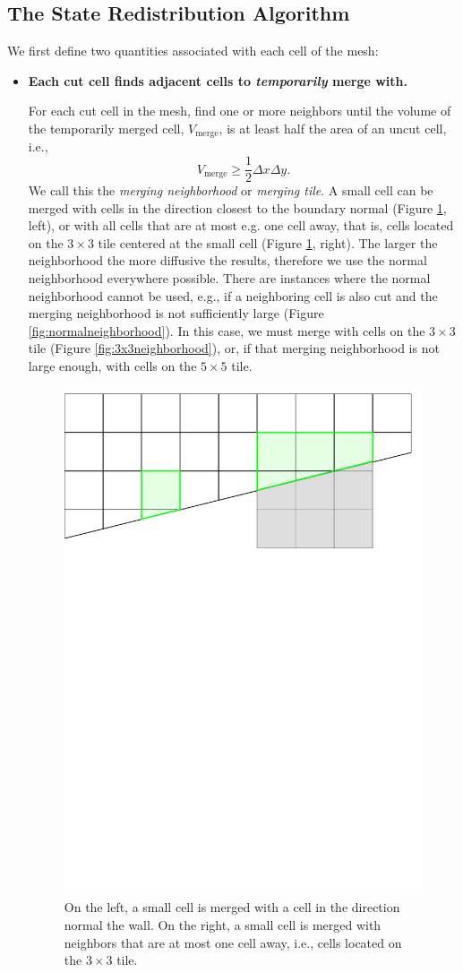 \subsection{The State Redistribution Algorithm}

We first define two quantities associated with each cell of the mesh:

\begin{itemize}
\item
{\bf Each cut cell finds adjacent cells to {\em temporarily} merge with.}

\vspace*{.1in}
For each cut cell in the mesh, find  one or more neighbors until the
volume of the temporarily merged cell, $V_{\text{merge}}$, is at least half the area of an uncut cell, i.e., 
\begin{equation} \label{eq:vmerge}
V_{\text{merge}} \geq \frac{1}{2}\Delta x\Delta y.
\end{equation}
We call this the 
{\em  merging neighborhood} or {\em merging tile}.  
A small cell can be merged with cells in the direction closest to the boundary normal (Figure \ref{fig:neighborhoods}, left), or with all cells that are at most e.g. one cell away, that is, cells located on the $3 \times 3$ tile centered at the small cell (Figure \ref{fig:neighborhoods}, right).
The larger the neighborhood the more diffusive the results, therefore we use the normal neighborhood everywhere possible.
There are instances where the normal neighborhood cannot be used, e.g., if a neighboring cell is also cut and the
merging neighborhood is not sufficiently large (Figure \ref{fig:normalneighborhood}).  In this case, we must merge with cells on the $3\times3$ tile (Figure \ref{fig:3x3neighborhood}), or, if that merging neighborhood is not large enough, with cells on the $5 \times 5$ tile.

\begin{figure}
    \centering
    \includegraphics[width=0.5\linewidth]{figs/neighborhoods.pdf}
    \caption{On the left, a small cell is merged with a cell in the direction normal the wall.  On the right, a small cell is merged with neighbors that are at most one cell away, i.e., cells located on the $3\times3$ tile.}
    \label{fig:neighborhoods}
\end{figure}


\end{itemize}
